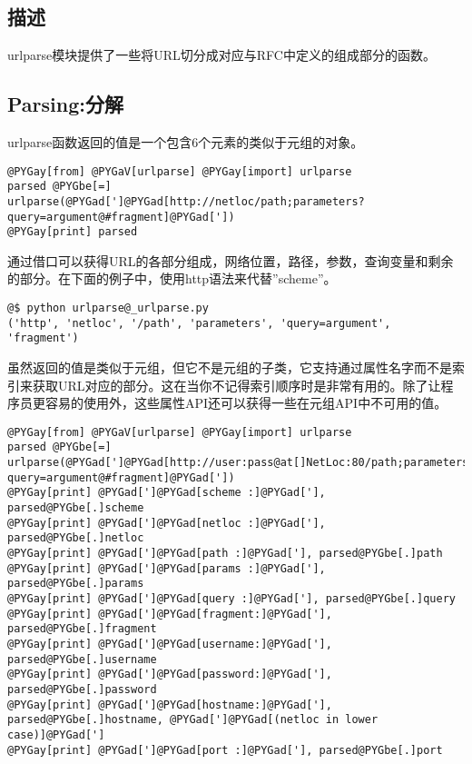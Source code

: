 \documentclass[a4paper,10pt,english]{manual}
\begin{document}
\subsection{描述}

urlparse模块提供了一些将URL切分成对应与RFC中定义的组成部分的函数。


\subsection{Parsing:分解}

urlparse函数返回的值是一个包含6个元素的类似于元组的对象。

\begin{Verbatim}[commandchars=@\[\]]
@PYGay[from] @PYGaV[urlparse] @PYGay[import] urlparse
parsed @PYGbe[=] urlparse(@PYGad[']@PYGad[http://netloc/path;parameters?query=argument@#fragment]@PYGad['])
@PYGay[print] parsed
\end{Verbatim}

通过借口可以获得URL的各部分组成，网络位置，路径，参数，查询变量和剩余的部分。在下面的例子中，使用http语法来代替''scheme''。

\begin{Verbatim}[commandchars=@\[\]]
@$ python urlparse@_urlparse.py
('http', 'netloc', '/path', 'parameters', 'query=argument', 'fragment')
\end{Verbatim}

虽然返回的值是类似于元组，但它不是元组的子类，它支持通过属性名字而不是索引来获取URL对应的部分。这在当你不记得索引顺序时是非常有用的。除了让程序员更容易的使用外，这些属性API还可以获得一些在元组API中不可用的值。

\begin{Verbatim}[commandchars=@\[\]]
@PYGay[from] @PYGaV[urlparse] @PYGay[import] urlparse
parsed @PYGbe[=] urlparse(@PYGad[']@PYGad[http://user:pass@at[]NetLoc:80/path;parameters?query=argument@#fragment]@PYGad['])
@PYGay[print] @PYGad[']@PYGad[scheme :]@PYGad['], parsed@PYGbe[.]scheme
@PYGay[print] @PYGad[']@PYGad[netloc :]@PYGad['], parsed@PYGbe[.]netloc
@PYGay[print] @PYGad[']@PYGad[path :]@PYGad['], parsed@PYGbe[.]path
@PYGay[print] @PYGad[']@PYGad[params :]@PYGad['], parsed@PYGbe[.]params
@PYGay[print] @PYGad[']@PYGad[query :]@PYGad['], parsed@PYGbe[.]query
@PYGay[print] @PYGad[']@PYGad[fragment:]@PYGad['], parsed@PYGbe[.]fragment
@PYGay[print] @PYGad[']@PYGad[username:]@PYGad['], parsed@PYGbe[.]username
@PYGay[print] @PYGad[']@PYGad[password:]@PYGad['], parsed@PYGbe[.]password
@PYGay[print] @PYGad[']@PYGad[hostname:]@PYGad['], parsed@PYGbe[.]hostname, @PYGad[']@PYGad[(netloc in lower case)]@PYGad[']
@PYGay[print] @PYGad[']@PYGad[port :]@PYGad['], parsed@PYGbe[.]port
\end{Verbatim}
\end{document}
